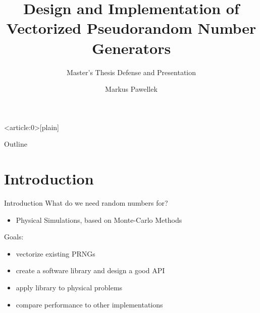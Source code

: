 \documentclass[aspectratio=169]{beamer}
\title{%
  Design and Implementation of Vectorized Pseudorandom Number Generators%
}
\subtitle{Master's Thesis Defense and Presentation}
\author{Markus Pawellek}
\begin{document}

  { %
      \begin{frame}<article:0>[plain]
       \end{frame}
  }

  \frame{\titlepage}
  \begin{frame}{Outline}
    \footnotesize
    \hfill\parbox[t][7cm][l]{0.9\textwidth}{\tableofcontents}
  \end{frame}

  \section{Introduction} %
  \label{sec:introduction}
    \begin{frame}{Introduction}
      What do we need random numbers for?
      \pause
      \begin{itemize}
        \item Physical Simulations, based on Monte-Carlo Methods
      \end{itemize}
      \bigskip
      \pause
      Goals:
      \begin{itemize}
        \pause
        \item vectorize existing PRNGs
        \pause
        \item create a software library and design a good API
        \pause
        \item apply library to physical problems
        \pause
        \item compare performance to other implementations
      \end{itemize}
    \end{frame}
\end{document}
